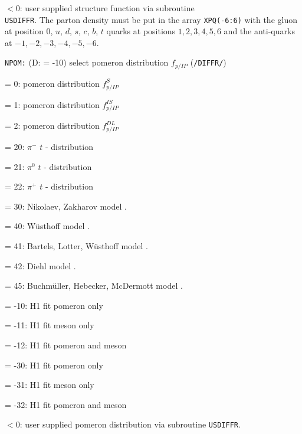 \documentclass[10pt]{article} \usepackage{dina4}
\newcommand{\PO}{\ensuremath{ I\! \! P} }
\newcommand{\deflab}[1]{#1\hfil}%
\newenvironment{defl}[1]%
  {\begin{list}{}{\settowidth{\labelwidth}{#1}%
  \setlength{\leftmargin}{\labelwidth}%
  \addtolength{\leftmargin}{\labelsep}%
  \setlength{\itemsep}{0pt plus 1pt}
  \setlength{\parsep}{0pt plus 1pt}
  \setlength{\topsep}{0pt plus 1pt}
  \setlength{\partopsep}{0pt plus 1pt}
  \setlength{\parskip}{2mm plus 1mm minus 1mm}
  \let\makelabel\deflab}}%
  {\end{list}}
\begin{document}
\begin{defl}{123456789012345}
\item[] $<0$: user supplied structure function via 
                           subroutine \\
                           \verb+USDIFFR+.
                           The parton density must be put in the
                           array \verb+XPQ(-6:6)+
                           with the gluon at position $0$,
                           $u$, $d$, $s$, $c$, $b$, $t$ quarks at
                           positions $1,2,3,4,5,6$ and the anti-quarks at 
                           $-1,-2,-3,-4,-5,-6$.  
\item[{\tt NPOM:}] (D: = -10) select pomeron distribution
                    $f_{p/\PO}$ (\verb+/DIFFR/+)
\item[] = 0: pomeron distribution $f^S_{p/\PO}$
\item[] = 1: pomeron distribution $f^{IS}_{p/\PO}$
\item[] = 2: pomeron distribution $f^{DL}_{p/\PO}$
\item[] = 20: $\pi^-$  $t$ - distribution \cite{Holtmann}
\item[] = 21: $\pi^0$ $t$ - distribution \cite{Holtmann}
\item[] = 22: $\pi^+$  $t$ - distribution \cite{Holtmann}
\item[] = 30: Nikolaev, Zakharov model \cite{NikZak}.
\item[] = 40: W\"usthoff model \cite{Wusthoff}.
\item[] = 41: Bartels, Lotter, W\"usthoff model 
                              \cite{Bartels_jets,Bartels_asym}.
\item[] = 42: Diehl model \cite{Diehl1,Diehl2}.
\item[] = 45: Buchm\"uller, Hebecker, McDermott model
                              \cite{Buchmuller_Hebecker_Mcdermott}.
\item[] = -10: H1 fit pomeron only \cite{H1_F2D3_97} 
\item[] = -11: H1 fit meson only \cite{H1_F2D3_97} 
\item[] = -12: H1 fit pomeron and meson \cite{H1_F2D3_97} 
\item[] = -30: H1 fit pomeron only \cite{H1_F2D3_06} 
\item[] = -31: H1 fit meson only \cite{H1_F2D3_06} 
\item[] = -32: H1 fit pomeron and meson \cite{H1_F2D3_06} 
\item[] $<0$: user supplied pomeron distribution via 
                           subroutine \verb+USDIFFR+.


\end{defl}
\end{document}
